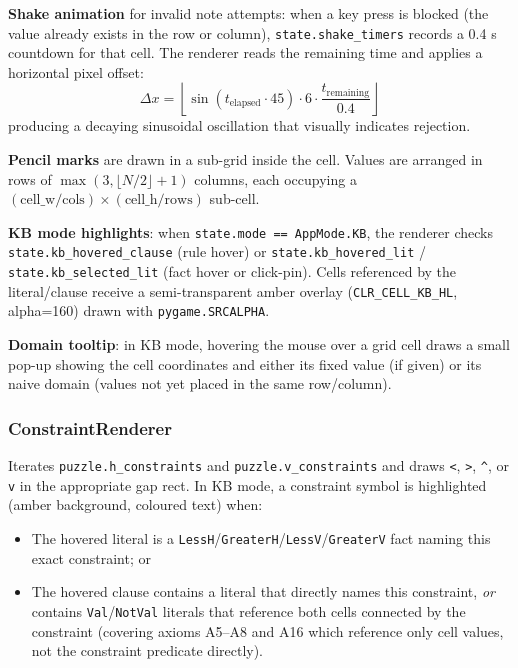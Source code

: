 \textbf{Shake animation} for invalid note attempts: when a key press is blocked
(the value already exists in the row or column), \texttt{state.shake\_timers}
records a 0.4 s countdown for that cell.
The renderer reads the remaining time and applies a horizontal pixel offset:
\[
  \Delta x = \left\lfloor \sin(t_\text{elapsed} \cdot 45) \cdot 6 \cdot
             \frac{t_\text{remaining}}{0.4} \right\rfloor
\]
producing a decaying sinusoidal oscillation that visually indicates rejection.

\textbf{Pencil marks} are drawn in a sub-grid inside the cell.
Values are arranged in rows of $\max(3, \lfloor N/2 \rfloor + 1)$ columns,
each occupying a $(\text{cell\_w}/\text{cols}) \times (\text{cell\_h}/\text{rows})$
sub-cell.

\textbf{KB mode highlights}: when \texttt{state.mode == AppMode.KB}, the
renderer checks \texttt{state.kb\_hovered\_clause} (rule hover) or
\texttt{state.kb\_hovered\_lit} / \texttt{state.kb\_selected\_lit} (fact hover
or click-pin).
Cells referenced by the literal/clause receive a semi-transparent amber
overlay (\texttt{CLR\_CELL\_KB\_HL}, alpha=160) drawn with
\texttt{pygame.SRCALPHA}.

\textbf{Domain tooltip}: in KB mode, hovering the mouse over a grid cell draws
a small pop-up showing the cell coordinates and either its fixed value (if
given) or its naive domain (values not yet placed in the same row/column).

\subsubsection{ConstraintRenderer}

Iterates \texttt{puzzle.h\_constraints} and \texttt{puzzle.v\_constraints} and
draws \texttt{<}, \texttt{>}, \texttt{\^}, or \texttt{v} in the appropriate
gap rect.
In KB mode, a constraint symbol is highlighted (amber background, coloured
text) when:
\begin{itemize}
  \item The hovered literal is a \texttt{LessH}/\texttt{GreaterH}/\texttt{LessV}/\texttt{GreaterV}
        fact naming this exact constraint; or
  \item The hovered clause contains a literal that directly names this
        constraint, \emph{or} contains \texttt{Val}/\texttt{NotVal} literals
        that reference both cells connected by the constraint
        (covering axioms A5–A8 and A16 which reference only cell values, not
        the constraint predicate directly).
\end{itemize}


